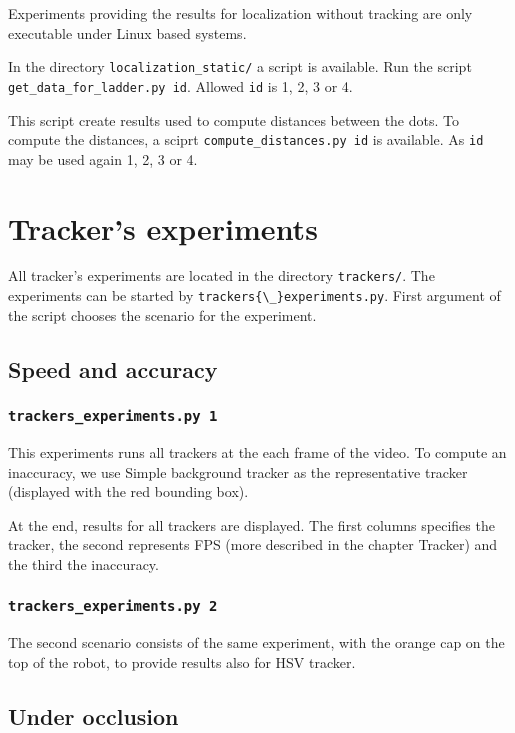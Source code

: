 Experiments providing the results for localization without tracking are only
executable under Linux based systems.

In the directory \verb+localization_static/+ a script is  available.
Run the script \verb+get_data_for_ladder.py id+. Allowed \verb+id+ is 1, 2, 3 or 4.

This script create results used to compute distances between the dots. To
compute the distances, a sciprt \verb+compute_distances.py id+ is available. As
\verb+id+ may be used again 1, 2, 3 or 4. 

\section{Tracker's experiments}

All tracker's experiments are located in the directory
\verb+trackers/+. The experiments can be started by \verb+trackers{\_}experiments.py+. First argument of the script chooses the scenario for the experiment.

\subsection*{Speed and accuracy}

\subsubsection*{\texttt{trackers{\_}experiments.py 1}}

This experiments runs all trackers at the each frame of the video. To compute
an inaccuracy, we use Simple background tracker as the representative tracker
(displayed with the red bounding box).

At the end, results for all trackers are displayed. The first columns specifies
the tracker, the second represents FPS (more described in the chapter Tracker)
and the third the inaccuracy.

\subsubsection*{\texttt{trackers{\_}experiments.py 2}}

The second scenario consists of the same experiment, with the orange cap on the
top of the robot, to provide results also for HSV tracker.

\subsection*{Under occlusion}

